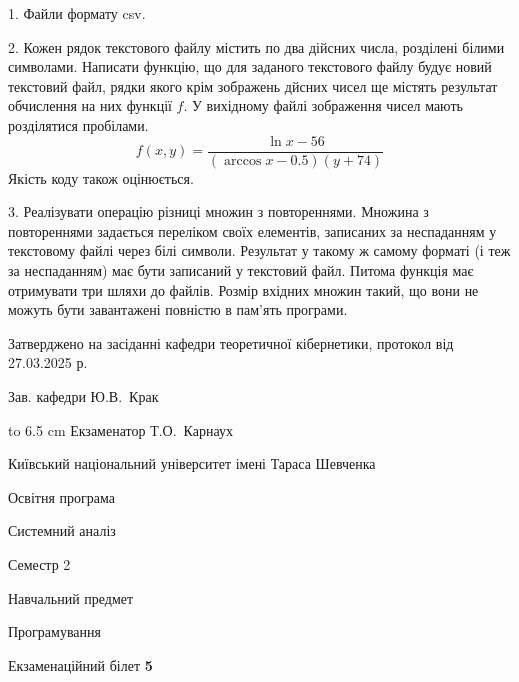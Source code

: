 \documentclass[12pt, ukrainian]{article}
\begin{document}
{%
1. Файли формату csv.%
\par
\vspace{2mm}

2. Кожен рядок текстового файлу містить по два дійсних числа, розділені білими символами.
Написати функцію, що для заданого текстового файлу будує новий текстовий файл, рядки якого крім зображень дйсних чисел ще містять результат обчислення на них функції $f$. У вихідному файлі зображення чисел мають розділятися пробілами. 
$$f(x, y) =\frac{\ln x - 56}{(\arccos x - 0.5) (y + 74)}$$ 
Якість коду також оцінюється.

\par
\vspace{2mm}

3. Реалізувати операцію різниці множин з повтореннями. Множина з повтореннями задається переліком своїх елементів, записаних за неспаданням у текстовому файлі через білі символи. Результат у такому ж самому форматі (і теж за неспаданням) має бути записаний у текстовий файл. Питома функція має отримувати три шляхи до файлів. Розмір вхідних множин такий, що вони не можуть бути завантажені повністю в пам’ять програми.

}
{\smallskip\smallskip \begin {scriptsize} Затверджено на засіданні кафедри теоретичної кібернетики, протокол   від   27.03.2025 р.\par\smallskip\smallskip\smallskip\smallskip
{\parbox {6.5 cm} {Зав. кафедри \dotfill Ю.В.~Крак}}\hspace {0.7cm} {\hbox to 6.5 cm { Екзаменатор \dotfill Т.О.~Карнаух}} \end{scriptsize}}
\newpage
{{\begin {scriptsize}\par
{ \center  Київський національний університет імені Тараса Шевченка \par}
{\parbox {5 cm}{Освітня програма \hfill}{\parbox {7 cm}{Системний аналіз\hfill}}\parbox {6 cm}{\hfill Семестр 2}}\par
{\parbox {5 cm} {Навчальний предмет \hfill}\parbox {7 cm}{Програмування \hfill}\parbox {6cm}{\hfill}\par}\vspace{-15pt} \end{scriptsize}}{\center Екзаменаційний білет \No \textbf { 5 }\par}}
\end{document}
